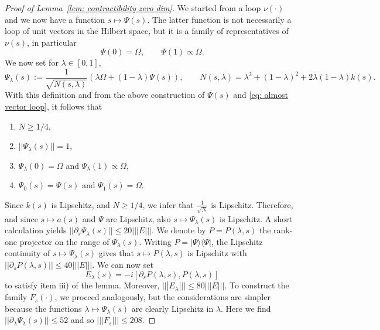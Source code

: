 \begin{proof}[Proof of Lemma~\ref{lem: contractibility zero dim}]
	We started from a loop $\nu(\cdot)$ and we now have a function $s\mapsto \Psi(s)$. The latter function is not necessarily a loop of unit vectors in the Hilbert space, but it is a family of representatives of $\nu(s)$, in particular 
	\begin{equation}\label{eq: almost vector loop}
	\Psi(0) = \Omega,\qquad \Psi(1) \propto \Omega.
	\end{equation}
	We now set for $\lambda\in[0,1]$,
	$$
	\Psi_\lambda(s):= \frac{1}{\sqrt{N(s,\lambda)}} \left(\lambda\Omega +  (1-\lambda) \Psi(s) \right),    \qquad  N(s,\lambda) = \lambda^2+(1-\lambda)^2+2\lambda(1-\lambda)k(s).
	$$
	With this definition and from the above construction of $\Psi(s)$ and \eqref{eq: almost vector loop}, it follows that 
	\begin{enumerate}
		\item $N \geq 1/4$,
		\item $||\Psi_\lambda(s)||=1$,
		\item $\Psi_\lambda(0) = \Omega$ and   $\Psi_\lambda(1)\propto \Omega$,
		\item $\Psi_0(s)=\Psi(s)$ and  $\Psi_1(s)=\Omega$.
	\end{enumerate}
	Since $k(s)$ is Lipschitz, and $N\geq 1/4$, we infer that $\frac{1}{\sqrt{N}}$ is Lipschitz. Therefore, and since $s\mapsto a(s)$ and $\Psi$ are Lipschitz, also $s\mapsto \Psi_\lambda(s)$ is Lipschitz. A short calculation yields $||\partial_s\Psi_\lambda(s)|| \leq 20 |||E|||$. We denote by $P=P(\lambda,s)$ the rank-one projector on the range of $\Psi_\lambda(s)$. Writing $P=|\Psi\rangle\langle\Psi|$, the Lipschitz continuity of $s\mapsto \Psi_\lambda(s)$ gives that $s\mapsto P(\lambda,s)$ is Lipschitz with $|| \partial_sP(\lambda,s) || \leq 40 |||E|||$. 
	We can now set
	$$
	E_\lambda(s)= -i [\partial_sP(\lambda,s) ,P(\lambda,s)]
	$$
	to satisfy item iii) of the lemma. Moreover, $||| E_\lambda |||\leq 80 |||E|||$.
	To construct the family $F_s(\cdot)$, we proceed analogously, but the considerations are simpler because the functions $\lambda\mapsto \Psi_\lambda(s)$ are clearly Lipschitz in $\lambda$. Here we find $||\partial_\lambda\Psi_\lambda(s)|| \leq 52$ and so $||| F_s |||\leq 208$.
\end{proof}















